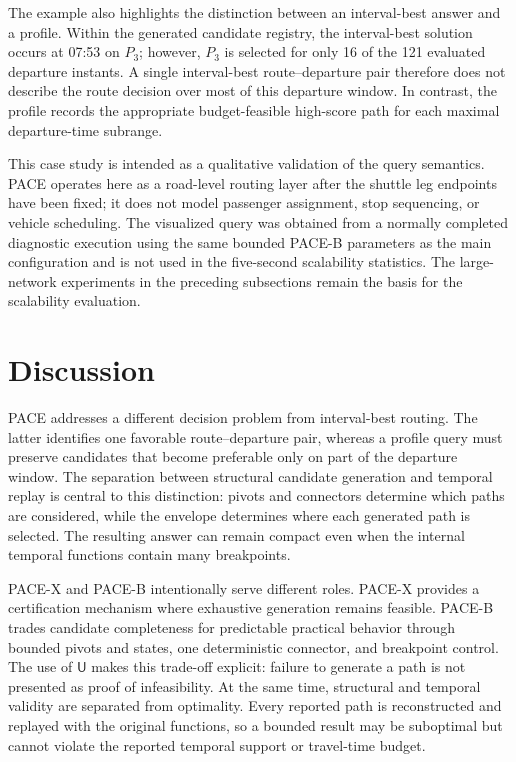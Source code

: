 \documentclass[a4paper,fleqn]{cas-dc}
\begin{document}
The example also highlights the distinction between an interval-best answer
and a profile. Within the generated candidate registry, the interval-best
solution occurs at 07:53 on \(P_3\); however, \(P_3\) is selected for only
16 of the 121 evaluated departure instants. A single interval-best
route--departure pair therefore does not describe the route decision over most
of this departure window. In contrast, the profile records the appropriate
budget-feasible high-score path for each maximal departure-time subrange.

This case study is intended as a qualitative validation of the query
semantics. PACE operates here as a road-level routing layer after the shuttle
leg endpoints have been fixed; it does not model passenger assignment, stop
sequencing, or vehicle scheduling. The visualized query was obtained from a
normally completed diagnostic execution using the same bounded PACE-B
parameters as the main configuration and is not used in the five-second
scalability statistics. The large-network experiments in the preceding
subsections remain the basis for the scalability evaluation.

\section{Discussion}
\label{sec:discussion}

PACE addresses a different decision problem from interval-best routing. The latter identifies one favorable route--departure pair, whereas a profile query must preserve candidates that become preferable only on part of the departure window. The separation between structural candidate generation and temporal replay is central to this distinction: pivots and connectors determine which paths are considered, while the envelope determines where each generated path is selected. The resulting answer can remain compact even when the internal temporal functions contain many breakpoints.

PACE-X and PACE-B intentionally serve different roles. PACE-X provides a certification mechanism where exhaustive generation remains feasible. PACE-B trades candidate completeness for predictable practical behavior through bounded pivots and states, one deterministic connector, and breakpoint control. The use of \(\mathsf U\) makes this trade-off explicit: failure to generate a path is not presented as proof of infeasibility. At the same time, structural and temporal validity are separated from optimality. Every reported path is reconstructed and replayed with the original functions, so a bounded result may be suboptimal but cannot violate the reported temporal support or travel-time budget.
\end{document}
